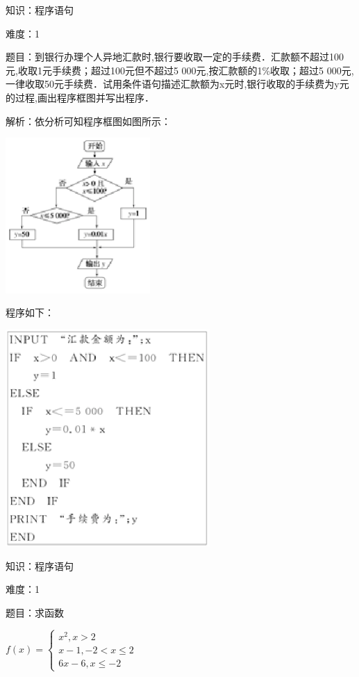 \documentclass{article} %
\begin{document}
知识：程序语句

难度：1

题目：到银行办理个人异地汇款时,银行要收取一定的手续费．汇款额不超过100元,收取1元手续费；超过100元但不超过5 000元,按汇款额的1\%收取；超过5 000元,一律收取50元手续费．试用条件语句描述汇款额为x元时,银行收取的手续费为y元的过程,画出程序框图并写出程序．

解析：依分析可知程序框图如图所示：

\includegraphics*[width=2.17in, height=2.33in, keepaspectratio=false]{image59}

程序如下：

\textit{\includegraphics*[width=3.06in, height=3.25in, keepaspectratio=false]{image60}}





知识：程序语句

难度：1

题目：求函数

$f(x)=
\left\{\begin{array}{l}
x^2,x>2\\
x-1,-2<x\le2\\
6x-6,x\le-2
\end{array}\right.$
\end{document}
